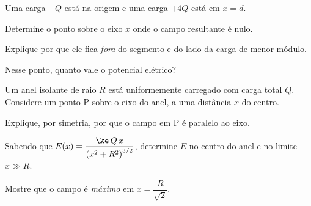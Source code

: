 \begin{questao}[3]{}

Uma carga $-Q$ está na origem e uma carga $+4Q$ está em $x=d$.
\begin{itensq}
\item Determine o ponto sobre o eixo $x$ onde o campo resultante é nulo.
\item Explique por que ele fica \emph{fora} do segmento e do lado da carga de
      menor módulo.
\item Nesse ponto, quanto vale o potencial elétrico?
\end{itensq}


\end{questao}
\begin{questao}[3]{}

Um anel isolante de raio $R$ está uniformemente carregado com carga total $Q$.
Considere um ponto P sobre o eixo do anel, a uma distância $x$ do centro.
\begin{itensq}
\item Explique, por simetria, por que o campo em P é paralelo ao eixo.
\item Sabendo que $E(x)=\dfrac{\ke\,Q\,x}{\left(x^{2}+R^{2}\right)^{3/2}}$,
      determine $E$ no centro do anel e no limite $x\gg R$.
\item Mostre que o campo é \emph{máximo} em $x = \dfrac{R}{\sqrt2}$.
\end{itensq}


\end{questao}

